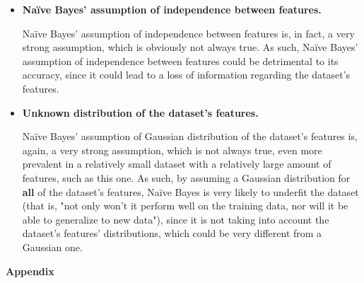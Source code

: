 \documentclass[12pt]{article}
\begin{document}
\begin{enumerate}[leftmargin=\labelsep,resume]
        \begin{itemize}
          \item \textbf{Naïve Bayes' assumption of independence between features.}

                Naïve Bayes' assumption of independence between features is, in fact, a very
                strong assumption, which is obviously not always true.
                As such, Naïve Bayes' assumption of independence between features could be
                detrimental to its accuracy, since it could lead to a loss of information
                regarding the dataset's features.

          \item \textbf{Unknown distribution of the dataset's features.}

                Naïve Bayes' assumption of Gaussian distribution of the dataset's features
                is, again, a very strong assumption, which is not always true,
                even more prevalent in a relatively small dataset with a relatively large
                amount of features, such as this one. As such, by assuming a Gaussian distribution
                for \textbf{all} of the dataset's features, Naïve Bayes is very likely to
                underfit the dataset (that is, "not only won't it perform well on the training data,
                nor will it be able to generalize to new data"), since it is not taking into account the dataset's
                features' distributions, which could be very different from a Gaussian one.
        \end{itemize}

\end{enumerate}

\pagebreak

\large{\textbf{Appendix}\vskip 0.3cm}


\end{document}
